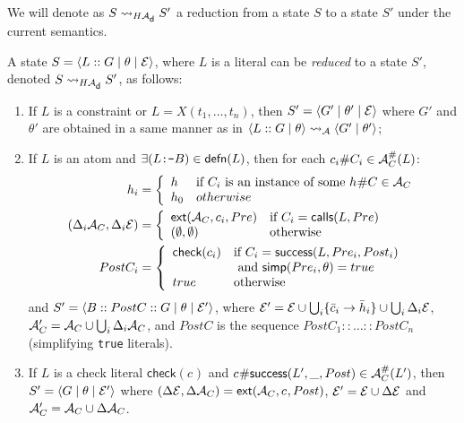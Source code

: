 \documentclass{llncs}
\newcommand{\A}
  {\ensuremath{{\cal A}}}
\newcommand{\AC}
  {\ensuremath{{\cal A}_{C}}}
\newcommand{\LabAClit}[1]
  {\ensuremath{\AC^{\#}(#1)}}
\newcommand{\gd}[0]{\mid}
\newcommand{\state}[2]
  {\ensuremath{\langle #1 \gd{} #2 \rangle}}
\newcommand{\exstate}[3]
  {\ensuremath{\langle #1 \gd{} #2 \gd{} #3 \rangle}}
\newcommand{\ADeps}{\ensuremath{{\cal E}}}
\newcommand{\defn}[1]
  {\ensuremath{\textsf{defn}(#1)}}
\newcommand{\simp}[1]
  {\ensuremath{\textsf{simp}(#1,\theta)}}
\newcommand{\ext}[2]
  {\ensuremath{\textsf{ext}(\A_C,#1,#2)}}
\newcommand{\reductionA}[2]
  {\ensuremath{#1 \leadsto_{\A} #2}}
\newcommand{\reductionHAd}[2]
  {\ensuremath{#1 \leadsto_{H\A_{\textsf{\scriptsize{d}}}} #2}}
\newcommand{\asrId}[1]{\ensuremath{c_{#1}}}
\newcommand{\negAsrId}[1]{\ensuremath{\bar{c}_{#1}}}
\newcommand{\hypId}[1]{\ensuremath{h_{#1}}}
\newcommand{\negHypId}[1]{\ensuremath{\bar{h}_{#1}}}
\newcommand{\checkLitLab}[1]{\ensuremath{\textsf{check}(#1)}}
\newcommand{\callsAsr}[2]{\ensuremath{\textsf{calls}(#1, #2)}}
\newcommand{\successAsr}[3]{\ensuremath{\textsf{success}(#1, #2, #3)}}
\newcommand{\labSuccessAsr}[4]
  {\ensuremath{\textsf{\asrId{#1}\#success}(#2, #3, #4)}}
\begin{document}
We will denote as $\reductionHAd{S}{S'}$ a reduction from a state $S$
to a state $S'$ under the current semantics. 
\begin{definition}
  \label{def:ho-ho-reductions}
  A state $S = \exstate{L::G}{\theta}{\ADeps}$, where $L$ is a literal
  can be \emph{reduced} to a state $S'$, denoted \reductionHAd{S}{S'},
  as follows:
  \begin{enumerate}\setlength{\itemsep}{0mm}\setlength{\parskip}{0mm}
  \item 
    If $L$ is a constraint or $L = X(t_1,\ldots,t_n)$, then
    $S' = \exstate{G'}{\theta'}{\ADeps}$ where $G'$ and $\theta'$
    are obtained in a same manner as in
    \reductionA{\state{L::G}{\theta}}{\state{G'}{\theta'}};
  \item 
    If $L$ is an atom and $\exists (L \mbox{\tt :-} B) \in \defn{L}$,
    then for each $\asrId{i}\#C_i \in \LabAClit{L}$:
      \begin{align*}
      \hypId{i} 
      &= \left\{
        \begin{array}{ll}
        \hypId{}
        & \text{if } C_i\text{ is an instance of some }\hypId{}\#C 
          \in \AC 
        \\
        \hypId{0}
        & otherwise
        \end{array} \right.
      \\
      (\Delta_i\AC,\Delta_i\ADeps) 
      &= \left\{
        \begin{array}{ll}
          \ext{\asrId{i}}{Pre} 
          & \textrm{if } C_i = \callsAsr{L}{Pre}
          \\
          (\emptyset,\emptyset) 
          & \textrm{otherwise}
        \end{array} \right.
      \\
      PostC_i 
      &=\left\{
        \begin{array}{ll}
          \checkLitLab{\asrId{i}} 
        & \text{if } C_i = \successAsr{L}{Pre_i}{Post_i} 
        \\
        & \text{ and } \simp{Pre_i} = true
        \\
          true
        & \textrm{otherwise}
        \end{array} \right.
    \end{align*}
      and $S' = \exstate{B :: PostC :: G}{\theta}{\ADeps'}$,
      where $\ADeps' = 
       \ADeps \cup \bigcup_i \{\negAsrId{i} \rightarrow \negHypId{i}\}
       \cup \bigcup_i \Delta_i\ADeps$,
      $\AC' = \AC \cup \bigcup_i \Delta_i\AC$,
      and $PostC$ is the sequence $PostC_1::\ldots::PostC_n$
      (simplifying \texttt{true} literals).
  \item 
    If $L$ is a check literal $\checkLitLab{\asrId{}}$ and
    $\labSuccessAsr{}{L'}{\_}{Post} \in
    \LabAClit{L'}$, then $S' = \exstate{G}{\theta}{\ADeps'}$ where
    $(\Delta\ADeps,\Delta\AC) = \ext{\asrId{}}{Post}$,
    $\ADeps' = \ADeps \cup \Delta\ADeps$ and $\AC' = \AC \cup
      \Delta\AC$.
  \end{enumerate}
\end{definition}
\end{document}
